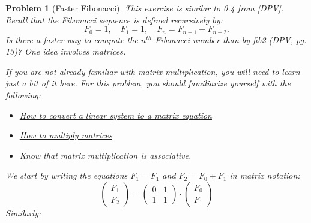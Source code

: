 \documentclass[10pt]{article}
\newtheorem{problem}{\sc\color{cit}Problem}
\begin{document}
\begin{problem}[Faster Fibonacci] This exercise is similar to 0.4 from [DPV]. Recall that the Fibonacci sequence is defined recursively by:
\[
    F_0 = 1,\quad F_1=1,\quad F_{n}= F_{n-1}+F_{n-2}.
\]
Is there a faster way to compute the $n^{th}$ Fibonacci number than by \emph{fib2} (DPV, pg. 13)? One idea involves matrices.

If you are not already familiar with matrix multiplication, you will need to learn just a bit of it here. For this problem, you should familiarize yourself with the following:
\begin{itemize}
    \item \href{https://www.khanacademy.org/math/algebra-home/alg-matrices/alg-representing-systems-with-matrices/a/representing-systems-with-matrices}{How to convert a linear system to a matrix equation}
    \item \href{https://www.khanacademy.org/math/precalculus/x9e81a4f98389efdf:matrices/x9e81a4f98389efdf:multiplying-matrices-by-matrices/a/multiplying-matrices}{How to multiply matrices}
    \item Know that matrix multiplication is associative.
\end{itemize}



We start by writing the equations $F_1 = F_1$ and $F_2 = F_0 + F_1$ in matrix notation:
\[
    \begin{pmatrix} F_1 \\ F_2\end{pmatrix} = \begin{pmatrix} 0 & 1\\ 1& 1\end{pmatrix}\cdot \begin{pmatrix} F_0 \\ F_1\end{pmatrix}
\]
Similarly:


\end{problem}
\end{document}

